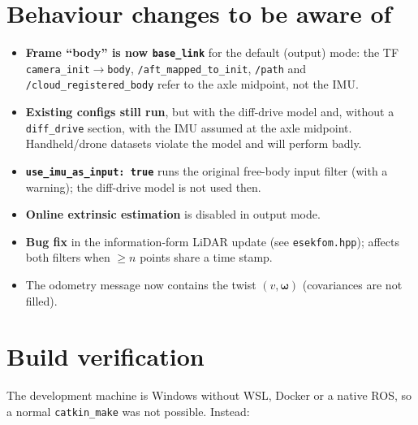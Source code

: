 \documentclass[11pt,a4paper]{article}
\newcommand{\f}[1]{\texttt{#1}}
\newcommand{\w}{\bm{\omega}}
\begin{document}
\section{Behaviour changes to be aware of}\label{sec:behaviour}
\begin{itemize}
\item \textbf{Frame ``body'' is now \f{base\_link}} for the default
  (output) mode: the TF \f{camera\_init}$\to$\f{body}, \f{/aft\_mapped\_to\_init},
  \f{/path} and \f{/cloud\_registered\_body} refer to the axle midpoint, not the IMU.
\item \textbf{Existing configs still run}, but with the diff-drive model and,
  without a \f{diff\_drive} section, with the IMU assumed at the axle midpoint.
  Handheld/drone datasets violate the model and will perform badly.
\item \textbf{\f{use\_imu\_as\_input: true}} runs the original free-body input
  filter (with a warning); the diff-drive model is not used then.
\item \textbf{Online extrinsic estimation} is disabled in output mode.
\item \textbf{Bug fix} in the information-form LiDAR update (see
  \f{esekfom.hpp}); affects both filters when $\ge n$ points share a time stamp.
\item The odometry message now contains the twist $(v,\w)$ (covariances are not filled).
\end{itemize}

\section{Build verification}\label{sec:verify}
The development machine is Windows without WSL, Docker or a native ROS, so a
normal \f{catkin\_make} was not possible. Instead:
\end{document}
